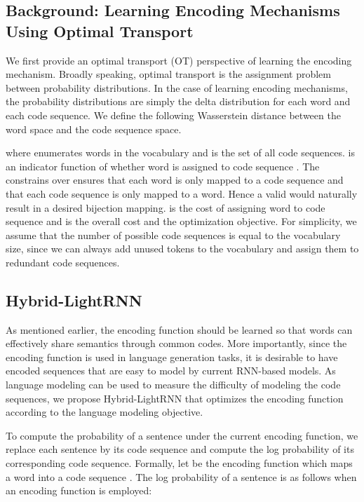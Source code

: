 \documentclass[letterpaper]{article} \usepackage{aaai19}  \usepackage{times}  \usepackage{helvet}  \usepackage{courier}  \usepackage{url}  \usepackage{graphicx}  \frenchspacing  \usepackage{booktabs}
\begin{document}
\subsection{Background: Learning Encoding Mechanisms Using Optimal Transport}
We first provide an optimal transport (OT) \cite{peyre2017computational} perspective of learning the encoding mechanism. Broadly speaking, optimal transport is the assignment problem between probability distributions. In the case of learning encoding mechanisms, the probability distributions are simply the delta distribution for each word and each code sequence. We define the following Wasserstein distance between the word space and the code sequence space. 



where  enumerates words in the vocabulary  and  is the set of all code sequences. 
 is an indicator function of whether word  is assigned to code sequence . The constrains over  ensures that each word is only mapped to a code sequence and that each code sequence is only mapped to a word. Hence a valid  would naturally result in a desired bijection mapping.  is the cost of assigning word  to code sequence  and  is the overall cost and the optimization objective.
For simplicity, we assume that the number of possible code sequences  is equal to the vocabulary size, since we can always add unused tokens to the vocabulary and assign them to redundant code sequences. 

\subsection{Hybrid-LightRNN}
As mentioned earlier, the encoding function should be learned so that words can effectively share semantics through common codes. More importantly, since the encoding function is used in language generation tasks, it is desirable to have encoded sequences that are easy to model by current RNN-based models. As language modeling can be used to measure the difficulty of modeling the code sequences, we propose Hybrid-LightRNN that optimizes the encoding function according to the language modeling objective.  

To compute the probability of a sentence under the current encoding function, we replace each sentence  by its code sequence and compute the log probability of its corresponding code sequence. Formally, let  be the encoding function which maps a word  into a code sequence . The log probability of a sentence is as follows when an encoding function is employed:
\end{document}
